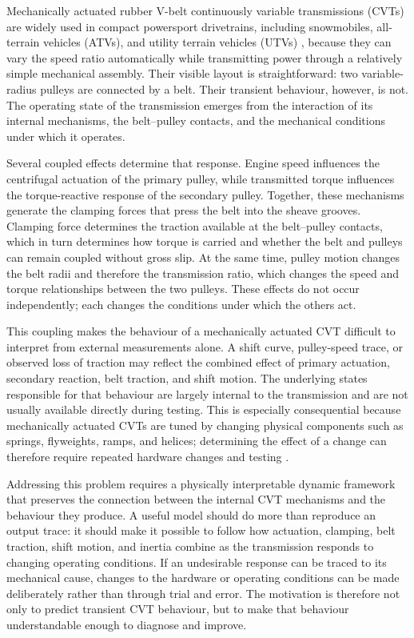 \documentclass[11pt]{report}
\numberwithin{equation}{section}
\begin{document}
Mechanically actuated rubber V-belt continuously variable transmissions (CVTs) are
widely used in compact powersport drivetrains, including snowmobiles,
all-terrain vehicles (ATVs), and utility terrain vehicles (UTVs)
\citep{Messick2018}, because they can vary the speed ratio automatically while
transmitting power through a relatively simple mechanical assembly. Their visible
layout is straightforward: two variable-radius pulleys are connected by a belt.
Their transient behaviour, however, is not. The operating state of the
transmission emerges from the interaction of its internal mechanisms, the
belt--pulley contacts, and the mechanical conditions under which it operates.

Several coupled effects determine that response. Engine speed influences the
centrifugal actuation of the primary pulley, while transmitted torque influences
the torque-reactive response of the secondary pulley. Together, these mechanisms
generate the clamping forces that press the belt into the sheave grooves.
Clamping force determines the traction available at the belt--pulley contacts,
which in turn determines how torque is carried and whether the belt and pulleys
can remain coupled without gross slip. At the same time, pulley motion changes
the belt radii and therefore the transmission ratio, which changes the speed and
torque relationships between the two pulleys. These effects do not occur
independently; each changes the conditions under which the others act.

This coupling makes the behaviour of a mechanically actuated CVT difficult to
interpret from external measurements alone. A shift curve, pulley-speed trace,
or observed loss of traction may reflect the combined effect of primary
actuation, secondary reaction, belt traction, and shift motion. The underlying
states responsible for that behaviour are largely internal to the transmission
and are not usually available directly during testing. This is especially
consequential because mechanically actuated CVTs are tuned by changing physical
components such as springs, flyweights, ramps, and helices; determining the
effect of a change can therefore require repeated hardware changes and testing
\citep{Skinner2020}.

Addressing this problem requires a physically interpretable dynamic framework
that preserves the connection between the internal CVT mechanisms and the
behaviour they produce. A useful model should do more than reproduce an output
trace: it should make it possible to follow how actuation, clamping, belt
traction, shift motion, and inertia combine as the transmission responds to
changing operating conditions. If an undesirable response can be traced to its
mechanical cause, changes to the hardware or operating conditions can be made
deliberately rather than through trial and error. The motivation is therefore
not only to predict transient CVT behaviour, but to make that behaviour
understandable enough to diagnose and improve.
\end{document}
